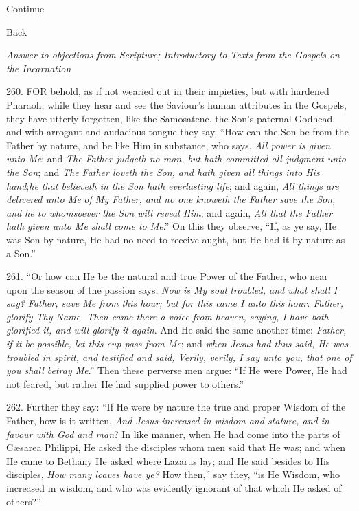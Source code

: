Continue

Back


\emph{Answer to
objections from Scripture; Introductory to Texts from the Gospels on
the Incarnation}

260.
FOR
behold, as if not wearied out in their impieties, but with hardened
Pharaoh, while they hear and see the Saviour's human attributes in the
Gospels, they have utterly forgotten, like the Samosatene, the Son's
paternal Godhead, and with arrogant and audacious tongue they say, ``How
can the Son be from the Father by nature, and be like Him in
substance, who says, \emph{All power is given unto Me}; and \emph{The
Father judgeth no man, but hath committed all judgment unto the Son};
and \emph{The Father loveth the Son, and hath given all things into His
hand};\emph{he that believeth in the Son hath everlasting life};
and again, \emph{All things are delivered unto Me} \emph{of My
Father, and no one knoweth the Father save the Son, and he to
whomsoever the Son will reveal Him}; and again, \emph{All that the
Father hath given unto Me shall come to Me}.'' On this they observe,
``If, as ye say, He was Son by nature, He had no need to receive aught,
but He had it by nature as a Son.''

261.
``Or how can He be the natural and true Power of the Father, who near
upon the season of the passion says, \emph{Now is My soul troubled, and
what shall I say? Father, save Me from this hour; but for this came I
unto this hour. Father, glorify Thy Name. Then came there a voice from
heaven, saying, I have both glorified it, and will glorify it again}.
And He said the same another time: \emph{Father, if it be possible, let
this cup pass from Me}; and \emph{when Jesus had thus said, He was
troubled in spirit, and testified and said, Verily, verily, I say unto
you, that one of you shall betray Me}.'' Then these perverse men
argue: ``If He were Power, He had not feared, but rather He had
supplied power to others.''

262.
Further they say: ``If He were by nature the true and proper Wisdom of
the Father, how is it written, \emph{And Jesus increased in wisdom and
stature, and in favour with God and man}? In like manner, when He
had come into the parts of Cæsarea Philippi, He asked the disciples
whom men said that He was; and when He came to Bethany He asked where
Lazarus lay; and He said besides to His disciples, \emph{How many loaves
have ye?} How then,'' say they, ``is He Wisdom, who increased in
wisdom, and who was evidently ignorant of that which He asked of
others?''

